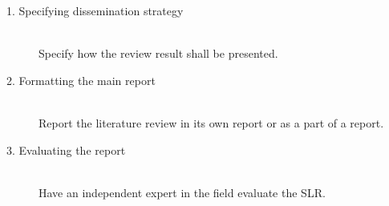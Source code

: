 \begin{description}

	\item[1. Specifying dissemination strategy] \hfill \\
		Specify how the review result shall be presented. 

	\item[2. Formatting the main report] \hfill \\
		Report the literature review in its own report or as a part of a report.

	\item[3. Evaluating the report] \hfill \\
		Have an independent expert in the field evaluate the SLR. 

\end{description}


